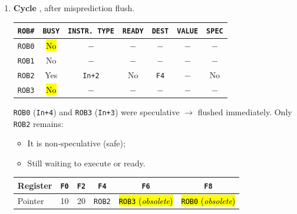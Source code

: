 \begin{examplebox}
\begin{enumerate}
        \setcounter{enumi}{\theenumi - 1}
        \item \textbf{Cycle \theenumi}, after misprediction flush.
        \begin{center}
            \begin{tabular}{@{} c | c | c | c | c | c | c @{}}
                \toprule
                \texttt{ROB\#} & \texttt{BUSY} & \texttt{INSTR. TYPE} & \texttt{READY} & \texttt{DEST} & \texttt{VALUE} & \texttt{SPEC} \\
                \midrule
                \texttt{ROB0} & \hl{No}     & $-$                   & $-$       & $-$               & $-$       & $-$           \\ [.3em]
                \texttt{ROB1} & No          & $-$                   & $-$       & $-$               & $-$       & $-$           \\ [.3em]
                \texttt{ROB2} & Yes         & \texttt{In+2}         & No        & \texttt{F4}       & $-$       & No            \\ [.3em]
                \texttt{ROB3} & \hl{No}     & $-$                   & $-$       & $-$               & $-$       & $-$           \\
                \bottomrule
            \end{tabular}
        \end{center}
        \texttt{ROB0} (\texttt{In+4}) and \texttt{ROB3} (\texttt{In+3}) were speculative $\rightarrow$ flushed immediately. Only \texttt{ROB2} remains:
        \begin{itemize}
            \item It is non-speculative (safe);
            \item Still waiting to execute or ready.
        \end{itemize}
        \begin{center}
            \begin{tabular}{@{} l | c c c c c @{}}
                \toprule
                Register    & \texttt{F0}   & \texttt{F2}   & \texttt{F4}           & \texttt{F6}                           & \texttt{F8}                           \\
                \midrule
                Pointer     & 10            & 20            & \texttt{ROB2}         & \hl{\texttt{ROB3} (\emph{obsolete})}  & \hl{\texttt{ROB0} (\emph{obsolete})}  \\
                \bottomrule
            \end{tabular}
        \end{center}
    \end{enumerate}
\end{examplebox}